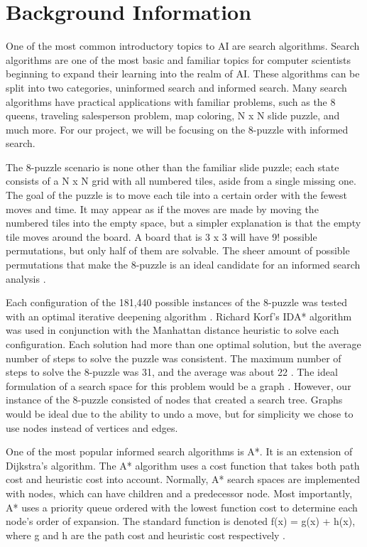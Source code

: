 \documentclass[titlepage]{article}
\begin{document}
\section{Background Information}
One of the most common introductory topics to AI are search algorithms. Search algorithms are one of the most basic and familiar topics for computer scientists beginning to expand their learning into the realm of AI. These algorithms can be split into two categories, uninformed search and informed search. Many search algorithms have practical applications with familiar problems, such as the 8 queens, traveling salesperson problem, map coloring, N x N slide puzzle, and much more. For our project, we will be focusing on the 8-puzzle with informed search.
\newline

The 8-puzzle scenario is none other than the familiar slide puzzle; each state consists of a N x N grid with all numbered tiles, aside from a single missing one. The goal of the puzzle is to move each tile into a certain order with the fewest moves and time. It may appear as if the moves are made by moving the numbered tiles into the empty space, but a simpler explanation is that the empty tile moves around the board. A board that is 3 x 3 will have 9! possible permutations, but only half of them are solvable. The sheer amount of possible permutations that make the 8-puzzle is an ideal candidate for an informed search analysis \cite{piltaver2012pathology}. 
\newline

Each configuration of the 181,440 possible instances of the 8-puzzle was tested with an optimal iterative deepening algorithm \cite{reinefeld1993complete}. Richard Korf's IDA* algorithm was used in conjunction with the Manhattan distance heuristic to solve each configuration. Each solution had more than one optimal solution, but the average number of steps to solve the puzzle was consistent. The maximum number of steps to solve the 8-puzzle was 31, and the average was about 22 \cite{reinefeld1993complete}. The ideal formulation of a search space for this problem would be a graph \cite{ratner1990n2}. However, our instance of the 8-puzzle consisted of nodes that created a search tree. Graphs would be ideal due to the ability to undo a move, but for simplicity we chose to use nodes instead of vertices and edges. 
\newline

One of the most popular informed search algorithms is A*. It is an extension of Dijkstra's algorithm. The A* algorithm uses a cost function that takes both path cost and heuristic cost into account. Normally, A* search spaces are implemented with nodes, which can have children and a predecessor node. Most importantly, A* uses a priority queue ordered with the lowest function cost to determine each node's order of expansion. The standard function is denoted f(x) = g(x) + h(x), where g and h are the path cost and heuristic cost respectively \cite{nosrati2012investigation}. 
\newline
\end{document}
